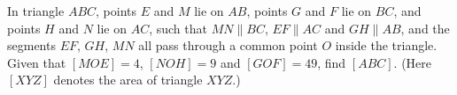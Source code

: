 In triangle $ABC$, points $E$ and $M$ lie on $AB$, points $G$ and $F$ lie on $BC$, and points $H$ and $N$ lie on $AC$, such that $MN\parallel BC$, $EF\parallel AC$ and $GH\parallel AB$, and the segments $EF$, $GH$, $MN$ all pass through a common point $O$ inside the triangle. Given that $[MOE]=4$, $[NOH]=9$ and $[GOF]=49$, find $[ABC]$. (Here $[XYZ]$ denotes the area of triangle $XYZ$.)
